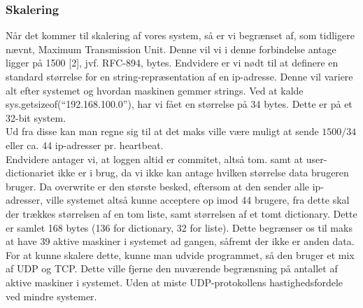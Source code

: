 \documentclass[a4paper,12pt]{article}
\begin{document}
\subsubsection{Skalering}
Når det kommer til skalering af vores system, så er vi begrænset af, som tidligere nævnt,  Maximum Transmission Unit. Denne vil vi i denne forbindelse antage ligger på 1500 [2], jvf. RFC-894, bytes. Endvidere er vi nødt til at definere en standard størrelse for en string-repræsentation af en ip-adresse. Denne vil variere alt efter systemet og hvordan maskinen gemmer strings. Ved at kalde sys.getsizeof(“192.168.100.0”), har vi fået en størrelse på 34 bytes. Dette er på et 32-bit system.
\\[5px]
Ud fra disse kan man regne sig til at det maks ville være muligt at sende $1500 / 34$ eller ca. 44 ip-adresser pr. heartbeat. 
\\ 
Endvidere antager vi, at loggen altid er commitet, altså tom. samt at user-dictionariet ikke er i brug, da vi ikke kan antage hvilken størrelse data brugeren bruger.
Da overwrite er den største besked, eftersom at den sender alle ip-adresser, ville systemet altså kunne acceptere op imod 44 brugere, fra dette skal der trækkes størrelsen af en tom liste, samt størrelsen af et tomt dictionary. Dette er samlet 168 bytes (136 for dictionary, 32 for liste). 
Dette begrænser os til maks at have 39 aktive maskiner i systemet ad gangen, såfremt der ikke er anden data.
\\
For at kunne skalere dette, kunne man udvide programmet, så den bruger et mix af UDP og TCP. Dette ville fjerne den nuværende begrænsning på antallet af aktive maskiner i systemet. Uden at miste UDP-protokollens hastighedsfordele ved mindre systemer.
\newpage
\end{document}
